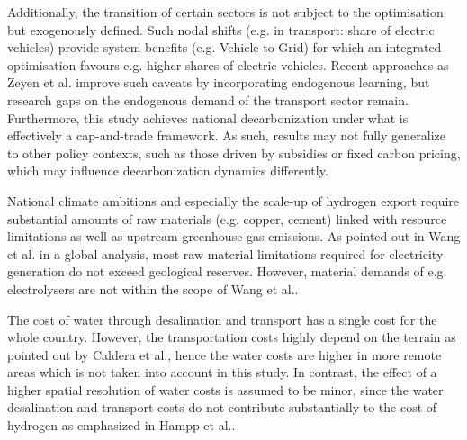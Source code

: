 \documentclass[5p,numafflabel]{elsarticle}
\begin{document}
Additionally, the transition of certain sectors is not subject to the optimisation but exogenously defined. Such nodal shifts (e.g. in transport: share of electric vehicles) provide system benefits (e.g. Vehicle-to-Grid) for which an integrated optimisation favours e.g. higher shares of electric vehicles.
Recent approaches as Zeyen et al.\cite{Zeyen2023} improve such caveats by incorporating endogenous learning, but research gaps on the endogenous demand of the transport sector remain.
Furthermore, this study achieves national decarbonization under what is effectively a cap-and-trade framework. As such, results may not fully generalize to other policy contexts, such as those driven by subsidies or fixed carbon pricing, which may influence decarbonization dynamics differently.

National climate ambitions and especially the scale-up of hydrogen export require substantial amounts of raw materials (e.g. copper, cement) linked with resource limitations as well as upstream greenhouse gas emissions. As pointed out in Wang et al.\cite{Wang2023} in a global analysis, most raw material limitations required for electricity generation do not exceed geological reserves. However, material demands of e.g. electrolysers are not within the scope of Wang et al.\cite{Wang2023}.

The cost of water through desalination and transport has a single cost for the whole country. However, the transportation costs highly depend on the terrain as pointed out by Caldera et al.\cite{Caldera2016}, hence the water costs are higher in more remote areas which is not taken into account in this study. In contrast, the effect of a higher spatial resolution of water costs is assumed to be minor, since the water desalination and transport costs do not contribute substantially to the cost of hydrogen as emphasized in Hampp et al.\cite{Hampp2023}.
\end{document}
